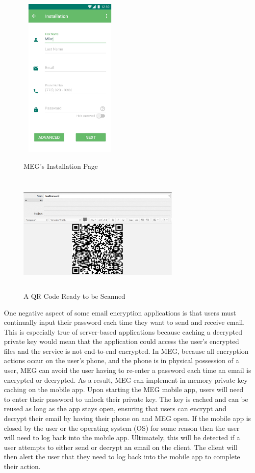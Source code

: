 \documentclass{sig-alternate-05-2015}
\begin{document}
\begin{figure}[H]
    \centering
    \includegraphics[height=8cm,width=5cm]{installation-page.jpg}
    \label{fig:installation}
    \caption{MEG's Installation Page}
\end{figure}
\begin{figure}[H]
    \centering
    \includegraphics[width=8cm,height=6cm]{qr-code-thunderbird.png}
    \caption{A QR Code Ready to be Scanned}
    \label{fig:qr}
\end{figure}
\par One negative aspect of some email encryption applications is that users must continually input their password each time they want to send and receive email. This is especially true of server-based applications because caching a decrypted private key would mean that the application could access the user's encrypted files and the service is not end-to-end encrypted. In MEG, because all encryption actions occur on the user's phone, and the phone is in physical possession of a user, MEG can avoid the user having to re-enter a password each time an email is encrypted or decrypted. As a result, MEG can implement  in-memory private key caching on the mobile app. Upon starting the MEG mobile app, users will need to enter their password to unlock their private key. The key is cached and can be reused as long as the app stays open, ensuring that users can encrypt and decrypt their email by having their phone on and MEG open. If the mobile app is closed by the user or the operating system (OS) for some reason then the user will need to log back into the mobile app. Ultimately, this will be detected if a user attempts to either send or decrypt an email on the client. The client will then alert the user that they need to log back into the mobile app to complete their action.
\end{document}
